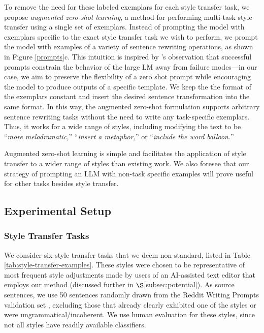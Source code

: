 To remove the need for these labeled exemplars for each style transfer task, we propose \textit{augmented zero-shot learning}, a method for performing multi-task style transfer using a single set of exemplars.
Instead of prompting the model with exemplars specific to the exact style transfer task we wish to perform, we prompt the model with examples of a variety of sentence rewriting operations, as shown in Figure \ref{prompts}c. 
This intuition is inspired by \citet{reynolds2021prompt}'s observation that successful prompts constrain the behavior of the large LM away from failure modes---in our case, we aim to preserve the flexibility of a zero shot prompt while encouraging the model to produce outputs of a specific template.
We keep the the format of the exemplars constant and insert the desired sentence transformation into the same format.
In this way, the augmented zero-shot formulation supports arbitrary sentence rewriting tasks without the need to write any task-specific exemplars.
Thus, it works for a wide range of styles, including modifying the text to be ``\textit{more melodramatic,}'' ``\textit{insert a metaphor,}'' or ``\textit{include the word balloon.}''

Augmented zero-shot learning is simple and facilitates the application of style transfer to a wider range of styles than existing work.
We also foresee that our strategy of prompting an LLM with non-task specific examples will prove useful for other tasks besides style transfer.

\subsection{Experimental Setup}


\subsubsection{Style Transfer Tasks}
We consider six style transfer tasks that we deem non-standard, listed in Table \ref{tab:style-transfer-examples}.
These styles were chosen to be representative of most frequent style adjustments made by users of an AI-assisted text editor that employs our method (discussed further in $\S$\ref{subsec:potential}). 
As source sentences, we use 50 sentences randomly drawn from the Reddit Writing Prompts validation set \citep{fan2018hierarchical}, excluding those that already clearly exhibited one of the styles or were ungrammatical/incoherent.
We use human evaluation for these styles, since not all styles have readily available classifiers.

